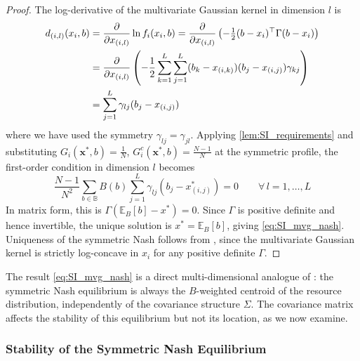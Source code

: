 \documentclass{article}
\begin{document}
            \begin{proof}
                The log-derivative of the multivariate Gaussian kernel in dimension $l$ is
                \begin{align}
                    d_{(i,l)}(x_i, b) &= \frac{\partial}{\partial x_{(i,l)}}\ln f_i(x_i,b) = \frac{\partial}{\partial x_{(i,l)}}\left(-\tfrac{1}{2}(b-x_i)^\top\Gamma(b-x_i)\right) \notag \\
                    &= \frac{\partial}{\partial x_{(i,l)}}\left(-\frac{1}{2}\sum_{k=1}^L\sum_{j=1}^L (b_k - x_{(i,k)})(b_j - x_{(i,j)})\gamma_{kj}\right) \notag \\
                    &= \sum_{j=1}^L \gamma_{lj}(b_j - x_{(i,j)}) \label{eq:SI_mvg_log_deriv}
                \end{align}
                where we have used the symmetry $\gamma_{lj} = \gamma_{jl}$. Applying \cref{lem:SI_requirements} and substituting $G_i(\mathbf{x}^*,b) = \frac{1}{N}$, $G_i^c(\mathbf{x}^*,b) = \frac{N-1}{N}$ at the symmetric profile, the first-order condition in dimension $l$ becomes
                \begin{equation}
                    \frac{N-1}{N^2}\sum_{b\in\mathbb{B}} B(b) \sum_{j=1}^L \gamma_{lj}(b_j - x_{(i,j)}^*) = 0\qquad \forall\, l = 1,\ldots,L
                \end{equation}
                In matrix form, this is $\Gamma\left(\mathbb{E}_B[b] - x^*\right) = 0$. Since $\Gamma$ is positive definite and hence invertible, the unique solution is $x^* = \mathbb{E}_B[b]$, giving \cref{eq:SI_mvg_nash}. Uniqueness of the symmetric Nash follows from , since the multivariate Gaussian kernel is strictly log-concave in $x_i$ for any positive definite $\Gamma$.
            \end{proof}
            
            The result \cref{eq:SI_mvg_nash} is a direct multi-dimensional analogue of : the symmetric Nash equilibrium is always the $B$-weighted centroid of the resource distribution, independently of the covariance structure $\Sigma$. The covariance matrix affects the stability of this equilibrium but not its location, as we now examine.

        \subsubsection{Stability of the Symmetric Nash Equilibrium}\label{subsec:SI_mvg_stability}
        
\end{document}
